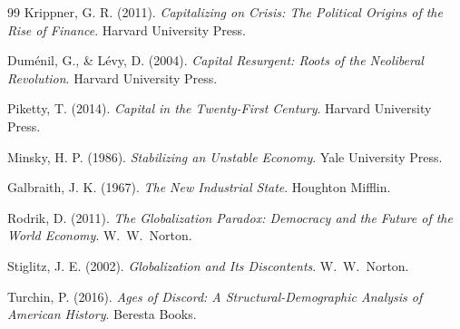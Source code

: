 \documentclass[12pt, a4paper]{article}
\theoremstyle{named}
\begin{document}
\begin{thebibliography}{99}
Krippner, G. R. (2011).
\textit{Capitalizing on Crisis: The Political Origins of the Rise of Finance}.
Harvard University Press.

Dum\'enil, G., \& L\'evy, D. (2004).
\textit{Capital Resurgent: Roots of the Neoliberal Revolution}.
Harvard University Press.

Piketty, T. (2014).
\textit{Capital in the Twenty-First Century}.
Harvard University Press.

Minsky, H. P. (1986).
\textit{Stabilizing an Unstable Economy}.
Yale University Press.

Galbraith, J. K. (1967).
\textit{The New Industrial State}.
Houghton Mifflin.

Rodrik, D. (2011).
\textit{The Globalization Paradox: Democracy and the Future of the World Economy}.
W.\ W.\ Norton.

Stiglitz, J. E. (2002).
\textit{Globalization and Its Discontents}.
W.\ W.\ Norton.

Turchin, P. (2016).
\textit{Ages of Discord: A Structural-Demographic Analysis of American History}.
Beresta Books.

\end{thebibliography}

\end{document}
